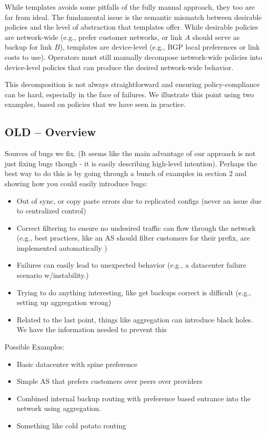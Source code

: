 While templates avoids some pitfalls of the fully manual approach, they too are far from ideal. The fundamental issue is the semantic mismatch between desirable policies and the level of abstraction that templates offer. While desirable policies are network-wide (e.g., prefer customer networks, or link $A$ should serve as backup for link $B$), templates are device-level (e.g., BGP local preferences or link costs to use). Operators must still manually decompose network-wide policies into device-level policies that can produce the desired network-wide behavior.

This decomposition is not always straightforward and ensuring policy-compliance can be hard, especially in the face of failures. We illustrate this point using two examples, based on policies that we have seen in practice. 



\subsection{OLD -- Overview}

Sources of bugs we fix. (It seems like the main advantage of our approach is not just fixing bugs though - it is easily describing high-level intention).
Perhaps the best way to do this is by going through a bunch of examples in section 2 and showing how you could easily introduce bugs:

\begin{itemize}
	\item Out of sync, or copy paste errors due to replicated configs (never an issue due to centralized control)
	\item Correct filtering to ensure no undesired traffic can flow through the network (e.g., best practices, like an AS should filter customers for their prefix, are implemented automatically )
	\item Failures can easily lead to unexpected behavior (e.g., a datacenter failure scenario w/instability.)
	\item Trying to do anything interesting, like get backups correct is difficult (e.g., setting up aggregation wrong)
	\item Related to the last point, things like aggregation can introduce black holes. We have the information needed to prevent this
\end{itemize}


Possible Examples:
\begin{itemize}
	\item Basic datacenter with spine preference
	\item Simple AS that prefers customers over peers over providers
	\item Combined internal backup routing with preference based entrance into the network using aggregation.
	\item Something like cold potato routing
\end{itemize}


